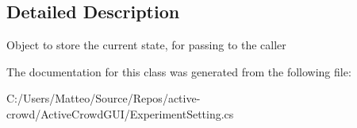 \subsection{Detailed Description}
Object to store the current state, for passing to the caller 



The documentation for this class was generated from the following file\+:\begin{DoxyCompactItemize}
\item 
C\+:/\+Users/\+Matteo/\+Source/\+Repos/active-\/crowd/\+Active\+Crowd\+G\+U\+I/Experiment\+Setting.\+cs\end{DoxyCompactItemize}
